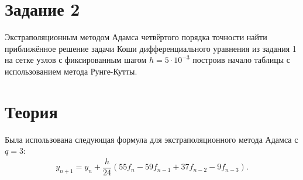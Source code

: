 \documentclass[10pt,a4paper,oneside,russian]{article}
\begin{document}
\section{Задание 2}
Экстраполяционным методом Адамса четвёртого порядка точности найти приближённое
решение задачи Коши дифференциального уравнения из задания 1 на сетке узлов с
фиксированным шагом $h = 5 \cdot 10^{-3}$ построив начало таблицы с использованием метода Рунге-Кутты.
\section{Теория}
Была использована следующая формула для экстраполяционного метода Адамса с $q = 3$:
\begin{align*}
  y_{n + 1} = y_n + \dfrac{h}{24}(55f_n - 59f_{n - 1} + 37f_{n - 2} - 9f_{n - 3}).
\end{align*}
\end{document}
